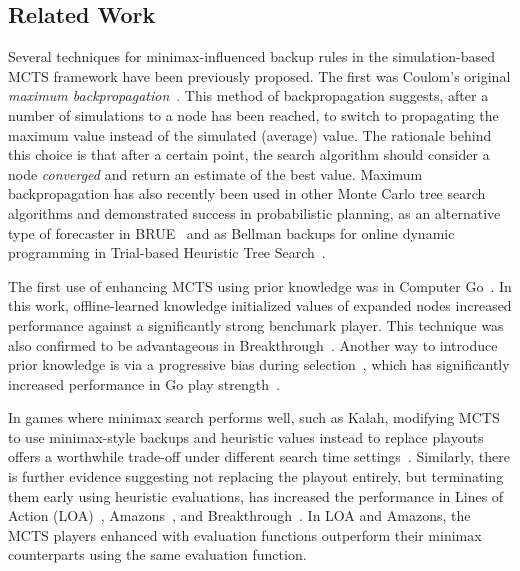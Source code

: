 \documentclass{article}
\begin{document}
\subsection{Related Work}

Several techniques for minimax-influenced backup rules in the simulation-based MCTS framework have been previously proposed. 
The first was Coulom's original {\it maximum backpropagation}~\cite{Coulom06Efficient}. This method of backpropagation
suggests, after a number of simulations to a node has been reached, to switch to propagating the maximum value instead 
of the simulated (average) value. 
The rationale behind this choice is that after a certain point, the search algorithm should consider a node
{\it converged} and return an estimate of the best value. 
Maximum backpropagation has also recently been used in other Monte Carlo tree search algorithms and demonstrated success in
probabilistic planning, as an alternative type of forecaster in BRUE~\cite{Feldman13Theoretically} and as Bellman 
backups for online dynamic programming in Trial-based Heuristic Tree Search~\cite{Keller13Trial}.

The first use of enhancing MCTS using prior knowledge was in Computer Go~\cite{Gelly07Combining}. 
In this work, offline-learned knowledge initialized values of expanded nodes increased performance against a significantly 
strong benchmark player. 
This technique was also confirmed to be advantageous in Breakthrough~\cite{Lorentz13Breakthrough}. 
Another way to introduce prior knowledge is via a progressive bias during selection~\cite{Chaslot08Progressive}, which has 
significantly increased performance in Go play strength~\cite{Chaslot10Adding}. 

In games where minimax search performs well, such as Kalah, 
modifying MCTS to use minimax-style backups and heuristic values instead to replace playouts offers a worthwhile trade-off 
under different search time settings~\cite{Ramanujan11Tradeoffs}.
Similarly, there is further evidence suggesting not replacing the playout entirely, but terminating them early 
using heuristic evaluations, has increased the performance in Lines of Action (LOA)~\cite{Winands10MCTS-LOA}, 
Amazons~\cite{Kloetzer10Amazons,Lorentz08Amazons}, and Breakthrough~\cite{Lorentz13Breakthrough}. In LOA and Amazons, the 
MCTS players enhanced with evaluation functions outperform their minimax counterparts using the same evaluation function.

\end{document}
